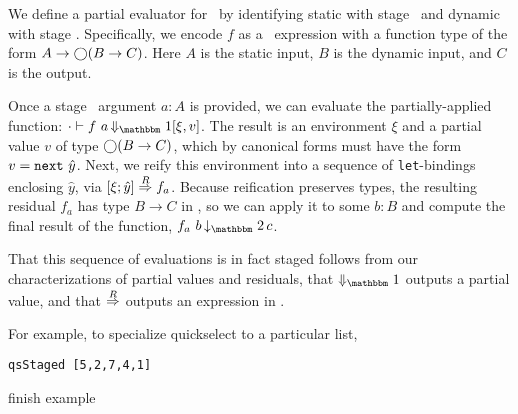 
We define a partial evaluator for \lang\ by identifying static with stage
\bbone\ and dynamic with stage \bbtwo.  Specifically, we encode $f$ as a \lang\
expression with a function type of the form $A\to\bigcirc(B\to C)$.%
%
Here $A$ is the static input, $B$ is the dynamic input, and $C$ is the output.

Once a stage \bbone\ argument $a:A$ is provided, we can evaluate the partially-applied
function:
$\cdot\vdash f~a \mathop{\redonesym} [\xi,v]$.
The result is an environment $\xi$ and a partial value $v$ of type $\bigcirc(B\to
C)$, which by canonical forms must have the form $v = {\tt next}~\hat y$. 
Next, we reify this environment into a sequence of \verb|let|-bindings
enclosing $\hat y$, via $[{\xi};{\hat y}]\overset{R}\Rightarrow{f_a}$. 
Because reification preserves types, the resulting residual $f_a$ has type $B\to C$ in \langTwo, so we can apply it to some $b:B$
and compute the final result of the function, $f_a~b \mathop{\tworedsym} c$.

That this sequence of evaluations is in fact staged follows from our
characterizations of partial values and residuals, that $\redonesym$
outputs a partial value, and that $\overset{R}\Rightarrow$ outputs an expression in \langTwo.

For example, to specialize quickselect to a particular list, 
\begin{lstlisting}
qsStaged [5,2,7,4,1]
\end{lstlisting}
\TODO finish example


